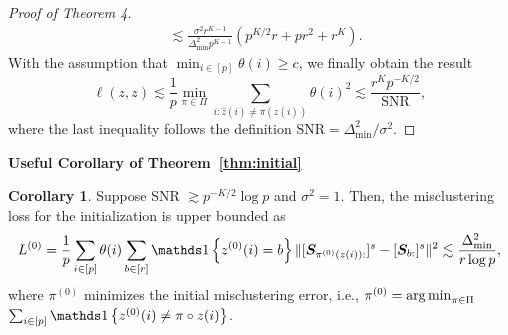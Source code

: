 \documentclass[lettersize,onecolumn,journal]{IEEEtran}
\theoremstyle{definition}
\newtheorem{cor}{Corollary}
\theoremstyle{definition}
\newcommand{\of}[1]{\left(#1\right)}
\newcommand{\offf}[1]{\left\{#1\right\}}
\begin{document}
\begin{proof}[Proof of Theorem 4]
\begin{align}
        & \lesssim \frac{\sigma^2 r^{K-1}}{ \Delta_{\min}^2  p^{K-1} } \of{ p^{K/2}r + pr^2 + r^K }.
    \end{align}
    With the assumption that $\min_{i \in [p]} \theta(i) \geq c$, we finally obtain the result
    \begin{equation}
        \ell(z, z) \lesssim \frac{1}{p}\min_{\pi \in \Pi} \sum_{i : \hat z(i) \neq \pi(z(i))} \theta(i)^2 \lesssim \frac{r^K p^{-K/2} }{ \text{SNR} },
    \end{equation}
    where the last inequality follows the definition $\text{SNR} = \Delta_{\min}^2/\sigma^2$.
\end{proof}

{\bf Useful Corollary of Theorem~\ref{thm:initial}} 

\begin{cor}\label{cor:L0} 
Suppose SNR $\gtrsim p^{-K/2} \log p$ and  $\sigma^2 = 1$. Then, the misclustering loss for the initialization is upper bounded as 
\begin{equation}
    L^{(0)} =  \frac{1}{p}  \sum_{i \in [p]} \theta(i) \sum_{b \in [r]}  \ind \offf{ z^{(0)}(i) = b } \onormSize{}{ [ \mS_{ \pi^{(0)}( z(i)):}  ]^s - [ \mS_{b:}  ]^s  }^2 \lesssim \frac{\Delta_{\min}^2}{r \log p},
\end{equation}
where $\pi^{(0)}$ minimizes the initial misclustering error, i.e., $\pi^{(0)} = \operatorname*{arg\,min}_{\pi \in \Pi} $ $ \sum_{i \in [p]}\ind \offf{z^{(0)}(i) \neq \pi \circ z(i) }$.
\end{cor}
\end{document}
